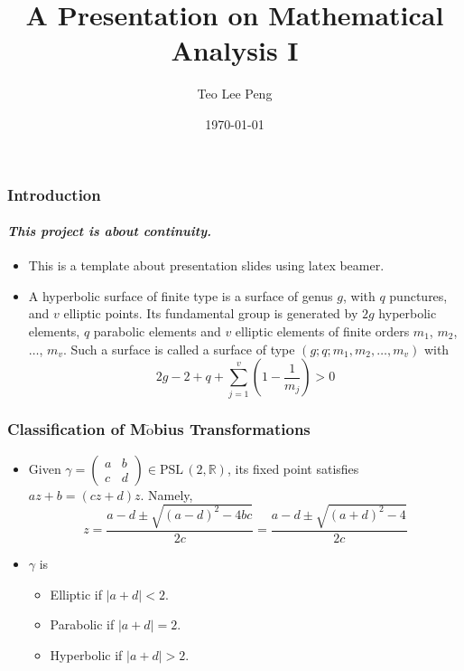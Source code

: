 \documentclass{beamer}
\newcommand{\di}{\displaystyle}
\begin{document}

\title[Mathematical Analysis I]{A Presentation on Mathematical Analysis I}
\author{ Teo Lee Peng}


\date{\today}

\begin{frame}
\titlepage
\end{frame}




\begin{frame}
\frametitle{Introduction }
\framesubtitle{\it{This project is about continuity.}}

\vspace{0.5cm}
\begin{itemize}

\item This is a template about presentation slides using latex beamer.

\item A hyperbolic surface of finite type is a surface of genus $g$, with $q$ punctures, and $v$ elliptic points. Its fundamental group is generated by $2g$ hyperbolic elements, $q$ parabolic elements and $v$ elliptic elements of finite orders $m_1$, $m_2$, $\ldots$, $m_v$. Such a surface is called a surface of type $(g;q;m_1, m_2, \ldots, m_v)$ with
    $$2g-2+q+\sum_{j=1}^v\left(1-\frac{1}{m_j}\right)>0$$
\end{itemize}

\end{frame}

\begin{frame}
\frametitle{Classification of M$\ddot{\text{o}}$bius Transformations  }
\begin{itemize}

\item Given $\di \gamma=\begin{pmatrix} a & b\\c&d\end{pmatrix}\in \text{PSL}\,(2,\mathbb{R})$,
its fixed point   satisfies $az+b=(cz+d)z$. Namely,
$$z=\frac{a-d\pm\sqrt{(a-d)^2-4bc}}{2c}=\frac{a-d\pm\sqrt{(a+d)^2-4 }}{2c}$$

\vspace{0.3cm}
\item $\gamma$ is

\vspace{0.3cm}
\begin{itemize}
\item Elliptic if $|a+d|<2$.

\vspace{0.3cm}
\item Parabolic if $|a+d|=2$.

\vspace{0.3cm}
\item Hyperbolic if $|a+d|>2$.

\end{itemize}


\end{itemize}


\end{frame}
\end{document}
